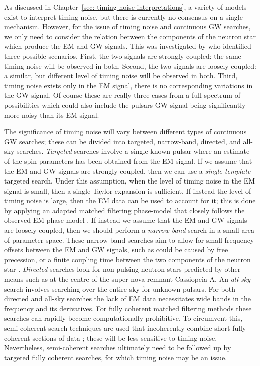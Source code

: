 \documentclass[../full_thesis/full_thesis.tex]{subfiles}
\begin{document}
As discussed in Chapter~\ref{sec: timing noise interpretations},
a variety of models exist to interpret timing noise, but there is
currently no consensus on a single mechanism. However, for the issue of timing
noise and continuous GW searches, we only need to consider the relation between the
components of the neutron star which produce the EM and GW signals.  This was
investigated by \citet{Jones2004} who identified three possible scenarios.
First, the two signals are strongly coupled: the same timing noise will be
observed in both. Second, the two signals are loosely coupled: a similar, but
different level of timing noise will be observed in both. Third, timing noise
exists only in the EM signal, there is no corresponding variations in the GW
signal. Of course these are really three cases from a full spectrum of
possibilities which could also include the pulsars GW signal being
significantly more noisy than its EM signal.

The significance of timing noise will vary between different types of continuous GW
searches; these can be divided into targeted, narrow-band, directed, and
all-sky searches.  \emph{Targeted} searches involve a single known pulsar where
an estimate of the spin parameters has been obtained from the EM signal. If we
assume that the EM and GW signals are strongly coupled, then we can use a
\emph{single-template} targeted search. Under this assumption, when the level
of timing noise in the EM signal is small, then a single Taylor expansion is
sufficient.  If instead the level of timing noise is large, then the EM data
can be used to account for it; this is done by applying an adapted
matched filtering phase-model that closely follows the observed EM phase model
\citep{Pitkin2004}. If instead we assume that the EM and GW signals are
loosely coupled, then we should perform a \emph{narrow-band} search in a small
area of parameter space.  These narrow-band searches aim to allow for small
frequency offsets between the EM and GW signals, such as could be caused by
free precession, or a finite coupling time between the two components of the
neutron star \citep{ligo2008}. \emph{Directed} searches look for non-pulsing
neutron stars predicted by other means such as at the centre of the super-nova
remnant Cassiopeia A. An \emph{all-sky} search involves searching over the
entire sky for unknown pulsars. For both directed and all-sky searches the lack
of EM data necessitates wide bands in the frequency and its derivatives. For
fully coherent matched filtering methods these searches can rapidly become
computationally prohibitive. To circumvent this, semi-coherent search
techniques are used that incoherently combine short fully-coherent sections of
data \citep{ligo2012}; these will be less sensitive to timing noise.
Nevertheless, semi-coherent searches  ultimately need to be followed up by
targeted fully coherent searches, for which timing noise may be an issue.
\end{document}
